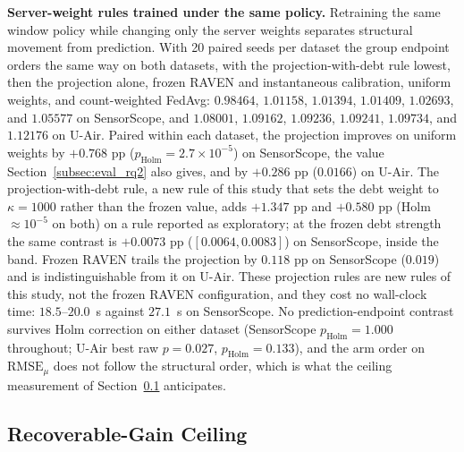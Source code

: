 \documentclass[letterpaper,journal]{IEEEtran}
\begin{document}
\noindent\textbf{Server-weight rules trained under the same policy.}
Retraining the same window policy while changing only the server weights
separates structural movement from prediction.  With 20 paired seeds per dataset
the group endpoint orders the same way on both datasets, with the
projection-with-debt rule lowest, then the projection alone, frozen RAVEN and
instantaneous calibration, uniform weights, and count-weighted FedAvg: $0.98464$,
$1.01158$, $1.01394$, $1.01409$, $1.02693$, and $1.05577$ on SensorScope, and
$1.08001$, $1.09162$, $1.09236$, $1.09241$, $1.09734$, and $1.12176$ on U-Air.
Paired within each dataset, the projection improves on uniform weights by
$+0.768$ pp ($p_{\mathrm{Holm}}=2.7\times10^{-5}$) on SensorScope, the value
Section~\ref{subsec:eval_rq2} also gives, and by $+0.286$ pp ($0.0166$) on U-Air.  The
projection-with-debt rule, a new rule of this study that sets the debt weight to
$\kappa=1000$ rather than the frozen value, adds $+1.347$ pp and $+0.580$ pp
(Holm $\approx10^{-5}$ on both) on a rule reported as exploratory; at the frozen
debt strength the same contrast is $+0.0073$ pp ($[0.0064,0.0083]$) on
SensorScope, inside the band.
Frozen RAVEN trails the projection by $0.118$ pp on SensorScope ($0.019$) and is
indistinguishable from it on U-Air.  These projection rules are new rules of
this study, not the frozen RAVEN configuration, and they cost no wall-clock time:
$18.5$--$20.0$~s against $27.1$~s on SensorScope.  No prediction-endpoint
contrast survives Holm correction on either dataset (SensorScope
$p_{\mathrm{Holm}}=1.000$ throughout; U-Air best raw $p=0.027$,
$p_{\mathrm{Holm}}=0.133$), and the arm order on $\mathrm{RMSE}_{\mu}$ does not
follow the structural order, which is what the ceiling measurement of
Section~\ref{subsec:ceiling} anticipates.

\subsection{Recoverable-Gain Ceiling}
\label{subsec:ceiling}
\end{document}
